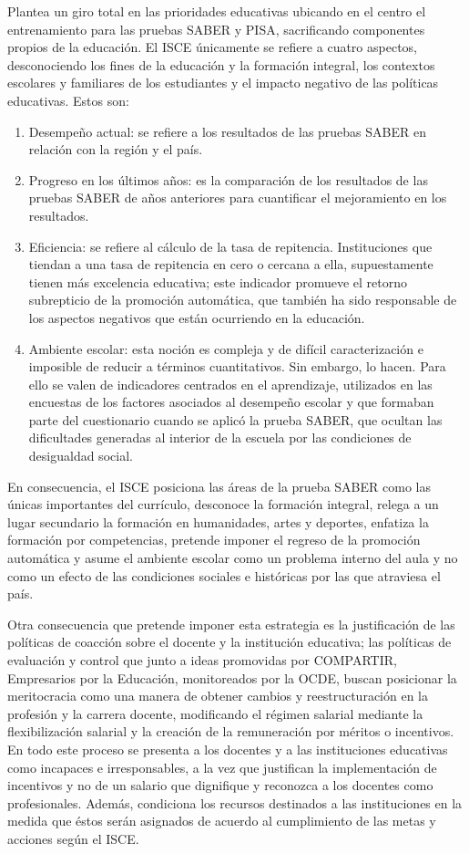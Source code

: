 \documentclass[10pt]{article}
\begin{document}
Plantea un giro total en las prioridades educativas ubicando en el centro el entrenamiento para las pruebas SABER y PISA, sacrificando componentes propios de la educación. El ISCE únicamente se refiere a cuatro aspectos, desconociendo los fines de la educación y la formación integral, los contextos escolares y familiares de los estudiantes y el impacto
negativo de las políticas educativas. Estos son:
\begin{enumerate}
\item Desempeño actual: se refiere a los resultados de las pruebas SABER en relación con la región y el país.
\item Progreso en los últimos años: es la comparación de los resultados de las pruebas SABER de años anteriores para cuantificar el mejoramiento en los resultados.
\item Eficiencia: se refiere al cálculo de la tasa de repitencia. Instituciones que tiendan a una tasa de repitencia en cero o cercana a ella, supuestamente tienen más excelencia
educativa; este indicador promueve el retorno subrepticio de la promoción automática, que también ha sido responsable de los aspectos negativos que están ocurriendo en la educación.
\item Ambiente escolar: esta noción es compleja y de difícil caracterización e imposible de reducir a términos cuantitativos. Sin embargo, lo hacen. Para ello se valen de
indicadores centrados en el aprendizaje, utilizados en las encuestas de los factores asociados al desempeño escolar y que formaban parte del cuestionario cuando se aplicó la prueba SABER, que ocultan las dificultades generadas al interior de la
escuela por las condiciones de desigualdad social.
\end{enumerate}
En consecuencia, el ISCE posiciona las áreas de la prueba SABER como las únicas importantes del currículo, desconoce la formación integral, relega a un lugar secundario la
formación en humanidades, artes y deportes, enfatiza la formación por competencias, pretende imponer el regreso de la promoción automática y asume el ambiente escolar como
un problema interno del aula y no como un efecto de las condiciones sociales e históricas por las que atraviesa el país.

Otra consecuencia que pretende imponer esta estrategia es la justificación de las políticas de coacción sobre el docente y la institución educativa; las políticas de evaluación y control
que junto a ideas promovidas por COMPARTIR, Empresarios por la Educación, monitoreados por la OCDE, buscan posicionar la meritocracia como una manera de obtener cambios y reestructuración en la profesión y la carrera docente, modificando el régimen salarial mediante la flexibilización salarial y la creación de la remuneración por méritos o
incentivos. En todo este proceso se presenta a los docentes y a las instituciones educativas como incapaces e irresponsables, a la vez que justifican la implementación de incentivos y no de un salario que dignifique y reconozca a los docentes como profesionales. Además, condiciona los recursos destinados a las instituciones en la medida que éstos serán asignados de acuerdo al cumplimiento de las metas y acciones según el ISCE.
\end{document}
